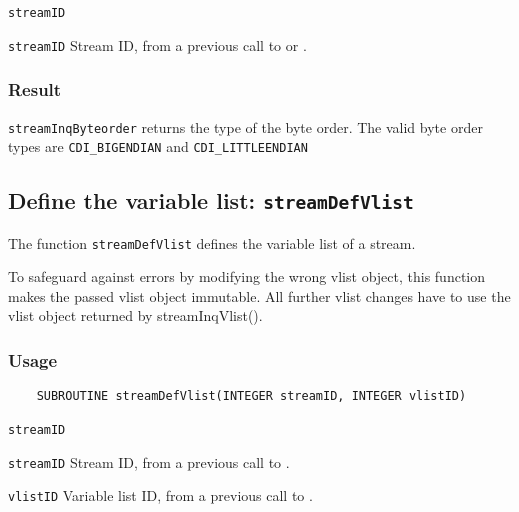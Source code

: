 \hspace*{4mm}\begin{minipage}[]{15cm}
\begin{deflist}{\texttt{streamID}\ }
\item[\texttt{streamID}]
Stream ID, from a previous call to {} or {}.

\end{deflist}
\end{minipage}

\subsubsection*{Result}

{\texttt{streamInqByteorder}} returns the type of the byte order.
The valid {\CDI} byte order types are {\texttt{CDI\_BIGENDIAN}} and {\texttt{CDI\_LITTLEENDIAN}}



\subsection{Define the variable list: \texttt{streamDefVlist}}
\label{streamDefVlist}

The function {\texttt{streamDefVlist}} defines the variable list of a stream.

To safeguard against errors by modifying the wrong vlist object,
this function makes the passed vlist object immutable.
All further vlist changes have to use the vlist object returned by streamInqVlist().

\subsubsection*{Usage}

\begin{verbatim}
    SUBROUTINE streamDefVlist(INTEGER streamID, INTEGER vlistID)
\end{verbatim}

\hspace*{4mm}\begin{minipage}[]{15cm}
\begin{deflist}{\texttt{streamID}\ }
\item[\texttt{streamID}]
Stream ID, from a previous call to {}.
\item[\texttt{vlistID}]
Variable list ID, from a previous call to {}.

\end{deflist}
\end{minipage}


